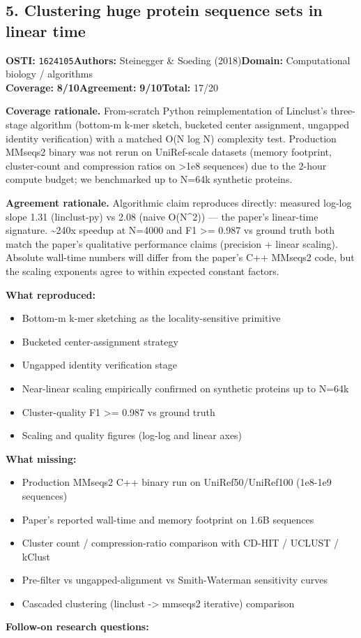 \documentclass[11pt]{article}
\newcommand{\scorebadge}[2]{\textbf{#1:} \textbf{#2/10}}
\begin{document}
\subsection{5. Clustering huge protein sequence sets in linear time}
\textbf{OSTI:} \texttt{1624105}\quad\textbf{Authors:} Steinegger \& Soeding (2018)\quad\textbf{Domain:} Computational biology / algorithms\\
\scorebadge{Coverage}{8}\quad\scorebadge{Agreement}{9}\quad\textbf{Total:} 17/20\par\smallskip
\noindent\textbf{Coverage rationale.} From-scratch Python reimplementation of Linclust's three-stage algorithm (bottom-m k-mer sketch, bucketed center assignment, ungapped identity verification) with a matched O(N log N) complexity test. Production MMseqs2 binary was not rerun on UniRef-scale datasets (memory footprint, cluster-count and compression ratios on \textgreater{}1e8 sequences) due to the 2-hour compute budget; we benchmarked up to N=64k synthetic proteins.\par
\noindent\textbf{Agreement rationale.} Algorithmic claim reproduces directly: measured log-log slope 1.31 (linclust-py) vs 2.08 (naive O(N\textasciicircum{}2)) --- the paper's linear-time signature. \textasciitilde{}240x speedup at N=4000 and F1 \textgreater{}= 0.987 vs ground truth both match the paper's qualitative performance claims (precision + linear scaling). Absolute wall-time numbers will differ from the paper's C++ MMseqs2 code, but the scaling exponents agree to within expected constant factors.\par\smallskip
\noindent\textbf{What reproduced:}
\begin{itemize}[leftmargin=1.4em,itemsep=0.2em,topsep=0.2em]
\item Bottom-m k-mer sketching as the locality-sensitive primitive
\item Bucketed center-assignment strategy
\item Ungapped identity verification stage
\item Near-linear scaling empirically confirmed on synthetic proteins up to N=64k
\item Cluster-quality F1 \textgreater{}= 0.987 vs ground truth
\item Scaling and quality figures (log-log and linear axes)
\end{itemize}\noindent\textbf{What missing:}
\begin{itemize}[leftmargin=1.4em,itemsep=0.2em,topsep=0.2em]
\item Production MMseqs2 C++ binary run on UniRef50/UniRef100 (1e8-1e9 sequences)
\item Paper's reported wall-time and memory footprint on 1.6B sequences
\item Cluster count / compression-ratio comparison with CD-HIT / UCLUST / kClust
\item Pre-filter vs ungapped-alignment vs Smith-Waterman sensitivity curves
\item Cascaded clustering (linclust -\textgreater{} mmseqs2 iterative) comparison
\end{itemize}\noindent\textbf{Follow-on research questions:}
\end{document}

